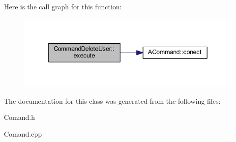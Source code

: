 Here is the call graph for this function\-:\nopagebreak
\begin{figure}[H]
\begin{center}
\leavevmode
\includegraphics[width=336pt]{class_command_delete_user_aa569e0aa0dfd5954b2d3d4334b63070d_cgraph}
\end{center}
\end{figure}




The documentation for this class was generated from the following files\-:\begin{DoxyCompactItemize}
\item 
Comand.\-h\item 
Comand.\-cpp\end{DoxyCompactItemize}
